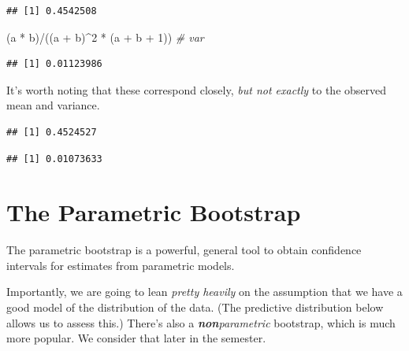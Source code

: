 \documentclass[
]{book}
\newenvironment{Shaded}{\begin{snugshade}}{\end{snugshade}}
\newcommand{\CommentTok}[1]{\textcolor[rgb]{0.56,0.35,0.01}{\textit{#1}}}
\newcommand{\DecValTok}[1]{\textcolor[rgb]{0.00,0.00,0.81}{#1}}
\newcommand{\FunctionTok}[1]{\textcolor[rgb]{0.00,0.00,0.00}{#1}}
\newcommand{\NormalTok}[1]{#1}
\newcommand{\SpecialCharTok}[1]{\textcolor[rgb]{0.00,0.00,0.00}{#1}}
\begin{document}
\begin{verbatim}
## [1] 0.4542508
\end{verbatim}

\begin{Shaded}
\begin{Highlighting}[]
\NormalTok{(a }\SpecialCharTok{*}\NormalTok{ b)}\SpecialCharTok{/}\NormalTok{((a }\SpecialCharTok{+}\NormalTok{ b)}\SpecialCharTok{\^{}}\DecValTok{2} \SpecialCharTok{*}\NormalTok{ (a }\SpecialCharTok{+}\NormalTok{ b }\SpecialCharTok{+} \DecValTok{1}\NormalTok{))  }\CommentTok{\# var}
\end{Highlighting}
\end{Shaded}

\begin{verbatim}
## [1] 0.01123986
\end{verbatim}

It's worth noting that these correspond closely, \emph{but not exactly}
to the observed mean and variance.

\begin{Shaded}
\end{Shaded}

\begin{verbatim}
## [1] 0.4524527
\end{verbatim}

\begin{Shaded}
\end{Shaded}

\begin{verbatim}
## [1] 0.01073633
\end{verbatim}

\hypertarget{the-parametric-bootstrap}{%
\section{The Parametric Bootstrap}\label{the-parametric-bootstrap}}

The parametric bootstrap is a powerful, general tool to obtain
confidence intervals for estimates from parametric models.

Importantly, we are going to lean \emph{pretty heavily} on the
assumption that we have a good model of the distribution of the data.
(The predictive distribution below allows us to assess this.) There's
also a \emph{\textbf{non}parametric} bootstrap, which is much more
popular. We consider that later in the semester.
\end{document}
